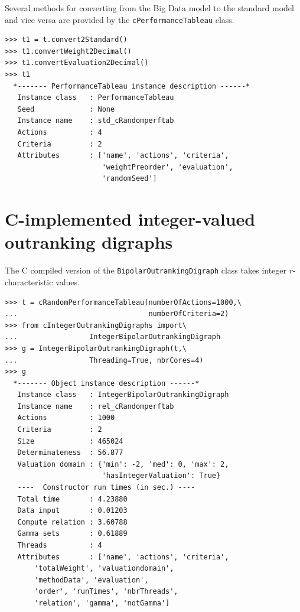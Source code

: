 Several methods for converting from the Big Data model to the standard model and vice versa are provided by the \texttt{cPerformanceTableau} class.
\begin{lstlisting}   
>>> t1 = t.convert2Standard()
>>> t1.convertWeight2Decimal()
>>> t1.convertEvaluation2Decimal()
>>> t1
  *------- PerformanceTableau instance description ------*
   Instance class   : PerformanceTableau
   Seed             : None
   Instance name    : std_cRandomperftab
   Actions          : 4
   Criteria         : 2
   Attributes       : ['name', 'actions', 'criteria',
                       'weightPreorder', 'evaluation',
                       'randomSeed']
\end{lstlisting}

\section{C-implemented integer-valued outranking digraphs}
\label{sec:11.3}

The C compiled version of the \texttt{BipolarOutrankingDigraph} class takes integer $r$-characteristic values.
\begin{lstlisting}[caption={Constructing big bipolar-valued outranking digraphs},label=list:11.2]
>>> t = cRandomPerformanceTableau(numberOfActions=1000,\
...                               numberOfCriteria=2)
>>> from cIntegerOutrankingDigraphs import\
...                 IntegerBipolarOutrankingDigraph
>>> g = IntegerBipolarOutrankingDigraph(t,\
...                 Threading=True, nbrCores=4)
>>> g
  *------- Object instance description ------*
   Instance class   : IntegerBipolarOutrankingDigraph
   Instance name    : rel_cRandomperftab
   Actions          : 1000
   Criteria         : 2
   Size             : 465024
   Determinateness  : 56.877
   Valuation domain : {'min': -2, 'med': 0, 'max': 2,
                       'hasIntegerValuation': True}
   ----  Constructor run times (in sec.) ----
   Total time       : 4.23880
   Data input       : 0.01203
   Compute relation : 3.60788
   Gamma sets       : 0.61889
   Threads          : 4
   Attributes       : ['name', 'actions', 'criteria',
       'totalWeight', 'valuationdomain',
       'methodData', 'evaluation',
       'order', 'runTimes', 'nbrThreads',
       'relation', 'gamma', 'notGamma']
\end{lstlisting}

